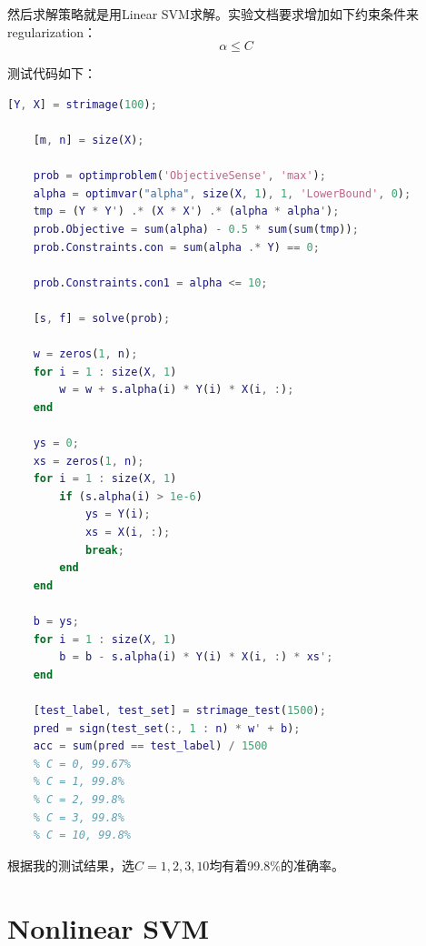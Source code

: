 \documentclass{article}
\begin{document}
然后求解策略就是用Linear SVM求解。实验文档要求增加如下约束条件来regularization：
\begin{equation}
	\alpha\leq C
\end{equation}

测试代码如下：
\begin{lstlisting}[language=matlab]
	[Y, X] = strimage(100);

	[m, n] = size(X);
	
	prob = optimproblem('ObjectiveSense', 'max');
	alpha = optimvar("alpha", size(X, 1), 1, 'LowerBound', 0);
	tmp = (Y * Y') .* (X * X') .* (alpha * alpha');
	prob.Objective = sum(alpha) - 0.5 * sum(sum(tmp));
	prob.Constraints.con = sum(alpha .* Y) == 0;
	
	prob.Constraints.con1 = alpha <= 10;
	
	[s, f] = solve(prob);
	
	w = zeros(1, n);
	for i = 1 : size(X, 1)
		w = w + s.alpha(i) * Y(i) * X(i, :);
	end
	
	ys = 0;
	xs = zeros(1, n);
	for i = 1 : size(X, 1)
		if (s.alpha(i) > 1e-6)
			ys = Y(i);
			xs = X(i, :);
			break;
		end
	end
	
	b = ys;
	for i = 1 : size(X, 1)
		b = b - s.alpha(i) * Y(i) * X(i, :) * xs';
	end
	
	[test_label, test_set] = strimage_test(1500);
	pred = sign(test_set(:, 1 : n) * w' + b);
	acc = sum(pred == test_label) / 1500
	% C = 0, 99.67%
	% C = 1, 99.8%
	% C = 2, 99.8%
	% C = 3, 99.8%
	% C = 10, 99.8%	
\end{lstlisting}

根据我的测试结果，选$C=1,2,3,10$均有着99.8\%的准确率。

\section{Nonlinear SVM}
\end{document}
